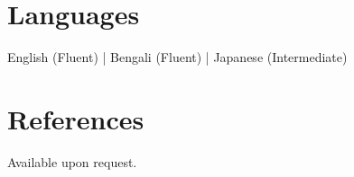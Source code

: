 \documentclass[11pt]{article}
\begin{document}
\section*{Languages}
English (Fluent) \; | \; Bengali (Fluent) \; | \; Japanese (Intermediate)

\section*{References}
Available upon request.
\end{document}
